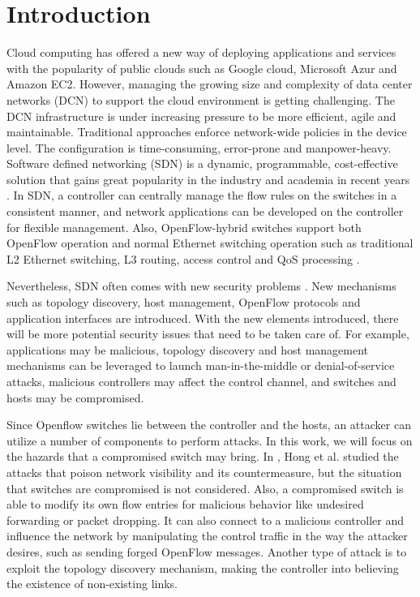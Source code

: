 \chapter{Introduction}
\label{chap:intro}
\setcounter{page}{1}

Cloud computing has offered a new way of deploying applications and services with the popularity of public clouds such as Google cloud, Microsoft Azur and Amazon EC2. However, managing the growing size and complexity of data center networks (DCN) to support the cloud environment is getting challenging. The DCN infrastructure is under increasing pressure to be more efficient, agile and maintainable. Traditional approaches enforce network-wide policies in the device level. The configuration is time-consuming, error-prone and manpower-heavy. Software defined networking (SDN) is a dynamic, programmable, cost-effective solution that gains great popularity in the industry and academia in recent years \cite{KRVRAU15, MABPPRST08, LHM10}. In SDN, a controller can centrally manage the flow rules on the switches in a consistent manner, and network applications can be developed on the controller for flexible management. Also, OpenFlow-hybrid switches support both OpenFlow operation and normal Ethernet switching operation such as traditional L2 Ethernet switching, L3 routing, access control and QoS processing \cite{OF_SPEC}.

Nevertheless, SDN often comes with new security problems \cite{SOS13,CM}. New mechanisms such as topology discovery, host management, OpenFlow protocols and application interfaces are introduced. With the new elements introduced, there will be more potential security issues that need to be taken care of. For example, applications may be malicious, topology discovery and host management mechanisms can be leveraged to launch man-in-the-middle or denial-of-service attacks, malicious controllers may affect the control channel, and switches and hosts may be compromised.

Since Openflow switches lie between the controller and the hosts, an attacker can utilize a number of components to perform attacks. In this work, we will focus on the hazards that a compromised switch may bring. In \cite{HXWG15}, Hong et al. studied the attacks that poison network visibility and its countermeasure, but the situation that switches are compromised is not considered. Also, a compromised switch is able to modify its own flow entries for malicious behavior like undesired forwarding or packet dropping. It can also connect to a malicious controller and influence the network by manipulating the control traffic in the way the attacker desires, such as sending forged OpenFlow messages. Another type of attack is to exploit the topology discovery mechanism, making the controller into believing the existence of non-existing links.

